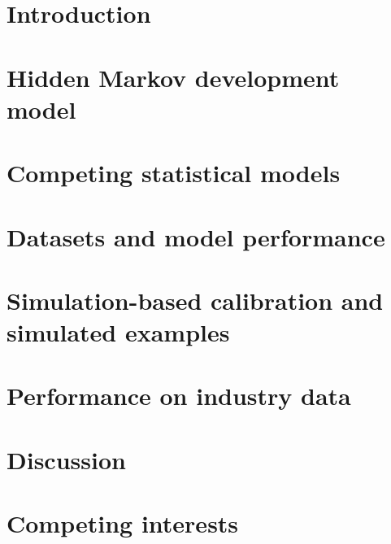 \documentclass[12pt]{article}
\author[]{}
\begin{document}
\maketitle
\linenumbers


\section{Introduction}
\label{sec:introduction}


\section{Hidden Markov development model}


\section{Competing statistical models}


\section{Datasets and model performance}


\section{Simulation-based calibration and simulated examples}


\section{Performance on industry data}
\label{sec:results}


\section{Discussion}
\label{sec:discussion}


\section{Competing interests}
\label{sec:interests}




\end{document}
